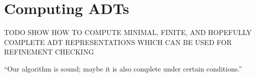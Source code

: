 \section{Computing ADTs}
\label{sec:computing}

TODO SHOW HOW TO COMPUTE MINIMAL, FINITE, AND HOPEFULLY COMPLETE ADT
REPRESENTATIONS WHICH CAN BE USED FOR REFINEMENT CHECKING

\begin{theorem}
  “Our algorithm is sound; maybe it is also complete under certain conditions.”
\end{theorem}
